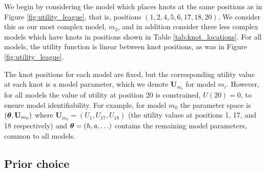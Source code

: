 We begin by considering the model which places knots at the same positions as in Figure \ref{fig:utility_league}, that
is, positions \((1, 2, 4, 5, 6, 17, 18, 20)\). We consider this as our most complex model, \(m_3\), and in addition
consider three less complex models which have knots in positions shown in Table \ref{tab:knot_locations}. For all
models, the utility function is linear between knot positions, as was in Figure \ref{fig:utility_league}.
\begin{table}
\centering
{}
\caption{\label{tab:knot_locations} A summary of the different knot positions in each of the four models}
\end{table}
The knot positions for each model are fixed, but the corresponding utility value at each knot is a model parameter,
which we denote \(\mathbf{U}_{m_i}\) for model \(m_i\). However, for all models the value of utility at position 20 is
constrained, \(U(20) = 0\), to ensure model identifiability. For example, for model \(m_0\) the parameter space is
\((\boldsymbol{\theta}, \mathbf{U}_{m_0})\) where \(\mathbf{U}_{m_0} = (U_1, U_{17}, U_{18})\) (the utility values at
positions 1, 17, and 18 respectively) and \(\boldsymbol{\theta} = (h, a, \ldots)\) contains the remaining model
parameters, common to all models.

\subsection{Prior choice}
\label{sec:Prior_choice1}

